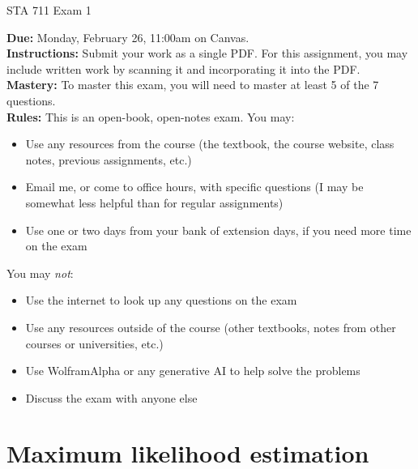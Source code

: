 \documentclass[11pt]{article}
\begin{document}
\begin{center}
\Large
STA 711 Exam 1\\
\normalsize
\vspace{5mm}
\end{center}

\noindent \textbf{Due:} Monday, February 26, 11:00am on Canvas.\\ 

\noindent \textbf{Instructions:} Submit your work as a single PDF. For this assignment, you may include written work by scanning it and incorporating it into the PDF.\\

\noindent \textbf{Mastery:} To master this exam, you will need to master at least 5 of the 7 questions.\\

\noindent \textbf{Rules:} This is an open-book, open-notes exam. You may:
\begin{itemize}
\item Use any resources from the course (the textbook, the course website, class notes, previous assignments, etc.)
\item Email me, or come to office hours, with specific questions (I may be somewhat less helpful than for regular assignments)
\item Use one or two days from your bank of extension days, if you need more time on the exam
\end{itemize}
You may \textit{not}:
\begin{itemize}
\item Use the internet to look up any questions on the exam
\item Use any resources outside of the course (other textbooks, notes from other courses or universities, etc.)
\item Use WolframAlpha or any generative AI to help solve the problems
\item Discuss the exam with anyone else
\end{itemize}

\newpage

\section*{Maximum likelihood estimation}
\end{document}
